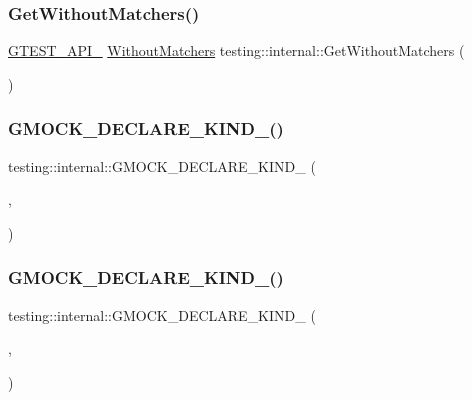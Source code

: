 \mbox{\label{namespacetesting_1_1internal_ad4e02ea077a717f95a10a03c10272f1c}} 
\subsubsection{\texorpdfstring{GetWithoutMatchers()}{GetWithoutMatchers()}}
{\footnotesize\ttfamily \mbox{\hyperlink{gtest-port_8h_aa73be6f0ba4a7456180a94904ce17790}{G\+T\+E\+S\+T\+\_\+\+A\+P\+I\+\_\+}} \mbox{\hyperlink{classtesting_1_1internal_1_1WithoutMatchers}{Without\+Matchers}} testing\+::internal\+::\+Get\+Without\+Matchers (\begin{DoxyParamCaption}{ }\end{DoxyParamCaption})}

\mbox{\label{namespacetesting_1_1internal_a20f5584732e44a368e7acf295b639319}} 
\subsubsection{\texorpdfstring{GMOCK\_DECLARE\_KIND\_()}{GMOCK\_DECLARE\_KIND\_()}\hspace{0.1cm}{\footnotesize\ttfamily [1/16]}}
{\footnotesize\ttfamily testing\+::internal\+::\+G\+M\+O\+C\+K\+\_\+\+D\+E\+C\+L\+A\+R\+E\+\_\+\+K\+I\+N\+D\+\_\+ (\begin{DoxyParamCaption}\item[{bool}]{,  }\item[{\mbox{\hyperlink{namespacetesting_1_1internal_aa8747bda20137c9aa7f846dee830e686a3af2191917fb1796599139b3615302fe}{k\+Bool}}}]{ }\end{DoxyParamCaption})}

\mbox{\label{namespacetesting_1_1internal_ac8f3722ca21d8b14f86e5c949e843508}} 
\subsubsection{\texorpdfstring{GMOCK\_DECLARE\_KIND\_()}{GMOCK\_DECLARE\_KIND\_()}\hspace{0.1cm}{\footnotesize\ttfamily [2/16]}}
{\footnotesize\ttfamily testing\+::internal\+::\+G\+M\+O\+C\+K\+\_\+\+D\+E\+C\+L\+A\+R\+E\+\_\+\+K\+I\+N\+D\+\_\+ (\begin{DoxyParamCaption}\item[{char}]{,  }\item[{\mbox{\hyperlink{namespacetesting_1_1internal_aa8747bda20137c9aa7f846dee830e686a8a52f0fd73e05da35c45d80653633cab}{k\+Integer}}}]{ }\end{DoxyParamCaption})}

